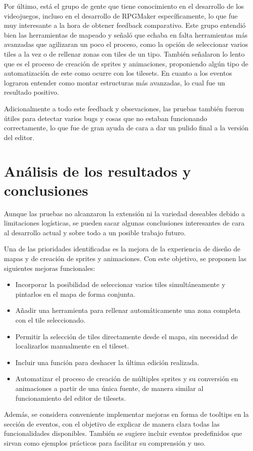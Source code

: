 \medskip

Por último, está el grupo de gente que tiene conocimiento en el desarrollo de los videojuegos, incluso en el desarrollo de RPGMaker específicamente, lo que fue muy interesante a la hora de obtener feedback comparativo. Este grupo entendió bien las herramientas de mapeado y señaló que echaba en falta herramientas más avanzadas que agilizaran un poco el proceso, como la opción de seleccionar varios tiles a la vez o de rellenar zonas con tiles de un tipo. También señalaron lo lento que es el proceso de creación de sprites y animaciones, proponiendo algún tipo de automatización de este como ocurre con los tilesets. En cuanto a los eventos lograron entender como montar estructuras más avanzadas, lo cual fue un resultado positivo. 

\medskip

Adicionalmente a todo este feedback y obsevaciones, las pruebas también fueron útiles para detectar varios bugs y cosas que no estaban funcionando correctamente, lo que fue de gran ayuda de cara a dar un pulido final a la versión del editor. 

\section{Análisis de los resultados y conclusiones}
Aunque las pruebas no alcanzaron la extensión ni la variedad deseables debido a limitaciones logísticas, se pueden sacar algunas conclusiones interesantes de cara al desarrollo actual y sobre todo a un posible trabajo futuro.

\smallskip 

Una de las prioridades identificadas es la mejora de la experiencia de diseño de mapas y de creación de sprites y animaciones. Con este objetivo, se proponen las siguientes mejoras funcionales:

\begin{itemize}
	\item Incorporar la posibilidad de seleccionar varios tiles simultáneamente y pintarlos en el mapa de forma conjunta. 

	\item Añadir una herramienta para rellenar automáticamente una zona completa con el tile seleccionado. 

	\item Permitir la selección de tiles directamente desde el mapa, sin necesidad de localizarlos manualmente en el tileset. 

	\item Incluir una función para deshacer la última edición realizada. 

	\item Automatizar el proceso de creación de múltiples sprites y su conversión en animaciones a partir de una única fuente, de manera similar al funcionamiento del editor de tilesets. 
\end{itemize}

Además, se considera conveniente implementar mejoras en forma de tooltips en la sección de eventos, con el objetivo de explicar de manera clara todas las funcionalidades disponibles. También se sugiere incluir eventos predefinidos que sirvan como ejemplos prácticos para facilitar su comprensión y uso.


